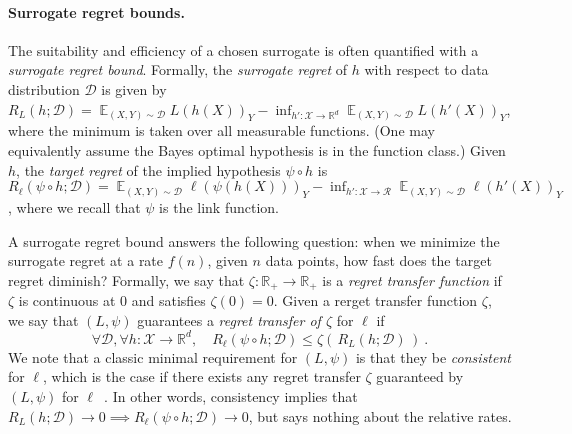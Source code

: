 \documentclass{article}
\theoremstyle{definition}\newtheorem{definition}{Definition}
\theoremstyle{definition}\newtheorem{assumption}{Assumption}
\newcommand{\reals}{\mathbb{R}}
\newcommand{\D}{\mathcal{D}}
\DeclareMathOperator{\E}{\mathbb{E}}  %
\newcommand{\R}{\mathcal{R}}
\newcommand{\X}{\mathcal{X}}
\begin{document}
\paragraph{Surrogate regret bounds.}
The suitability and efficiency of a chosen surrogate is often quantified with a \emph{surrogate regret bound}.
Formally, the \emph{surrogate regret} of $h$ with respect to data distribution $\D$ is given by $R_L(h;\D) = \E_{(X,Y)\sim\D} L(h(X))_Y - \inf_{h':\X\to\reals^d} \E_{(X,Y)\sim\D} L(h'(X))_Y$, where the minimum is taken over all measurable functions.
(One may equivalently assume the Bayes optimal hypothesis is in the function class.)
Given $h$, the \emph{target regret} of the implied hypothesis $\psi \circ h$ is $R_\ell(\psi\circ h;\D) = \E_{(X,Y)\sim\D} \ell(\psi(h(X)))_Y - \inf_{h':\X\to\R} \E_{(X,Y)\sim\D} \ell(h'(X))_Y$, where we recall that $\psi$ is the link function.


A surrogate regret bound answers the following question: when we minimize the surrogate regret at a rate $f(n)$, given $n$ data points, how fast does the target regret diminish?
Formally, we say that $\zeta : \reals_+ \to \reals_+$ is a \emph{regret transfer function} if $\zeta$ is continuous at $0$ and satisfies $\zeta(0) = 0$.
Given a rerget transfer function $\zeta$, we say that $(L,\psi)$ guarantees a \emph{regret transfer of $\zeta$} for $\ell$ if
\begin{equation}
  \label{eq:surrogate-regret-bound}
  \forall \D, \forall h:\X\to\reals^d, \quad R_\ell(\psi\circ h;\D) \leq \zeta(\, R_L(h;\D) \,)~.
\end{equation}
We note that a classic minimal requirement for $(L,\psi)$ is that they be \emph{consistent} for $\ell$, which is the case if there exists any regret transfer $\zeta$ guaranteed by $(L,\psi)$ for $\ell$~\cite{steinwart2008support}.
In other words, consistency implies that $R_L(h;\D) \to 0 \implies R_{\ell}(\psi \circ h;\D) \to 0$, but says nothing about the relative rates.
\end{document}
